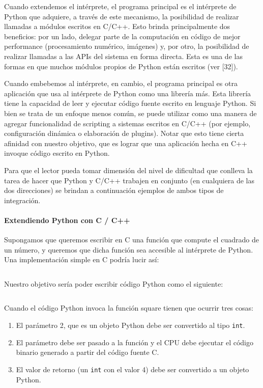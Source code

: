 \documentclass[]{article}
\begin{document}

Cuando extendemos el intérprete, el programa principal es el intérprete de
Python que adquiere, a través de este mecanismo, la posibilidad de realizar
llamadas a módulos escritos en C/C++. Esto brinda principalmente dos
beneficios: por un lado, delegar parte de la computación en código de mejor
performance (procesamiento numérico, imágenes) y, por otro, la posibilidad de
realizar llamadas a las APIs del sistema en forma directa. Esta es una de las
formas en que muchos módulos propios de Python están escritos (ver [32]).

Cuando embebemos al intérprete, en cambio, el programa principal es otra
aplicación que usa al intérprete de Python como una librería más. Esta librería
tiene la capacidad de leer y ejecutar código fuente escrito en lenguaje Python.
Si bien se trata de un enfoque menos común, se puede utilizar como una manera
de agregar funcionalidad de scripting a sistemas escritos en C/C++ (por
ejemplo, configuración dinámica o elaboración de plugins). Notar que esto tiene
cierta afinidad con nuestro objetivo, que es lograr que una aplicación hecha en
C++ invoque código escrito en Python.

Para que el lector pueda tomar dimensión del nivel de dificultad que conlleva
la tarea de hacer que Python y C/C++ trabajen en conjunto (en cualquiera de las
dos direcciones) se brindan a continuación ejemplos de ambos tipos de
integración.

\paragraph{Extendiendo Python con C / C++}

Supongamos que queremos escribir en C una función que compute el cuadrado de un
número, y queremos que dicha función sea accesible al intérprete de Python.
Una implementación simple en C podría lucir así:

\inputminted{c}{codelistings/square.cc}

Nuestro objetivo sería poder escribir código Python como el siguiente:

\inputminted{Python}{codelistings/square_usage.py}

Cuando el código Python invoca la función square tienen que ocurrir tres cosas:

\begin{enumerate}
    \item El parámetro 2, que es un objeto Python debe ser convertido al tipo
\verb!int!.

    \item El parámetro debe ser pasado a la función y el CPU debe ejecutar el
código binario generado a partir del código fuente C.

    \item El valor de retorno (un \verb!int! con el valor 4) debe ser
convertido a un objeto Python.
\end{enumerate}
\end{document}
